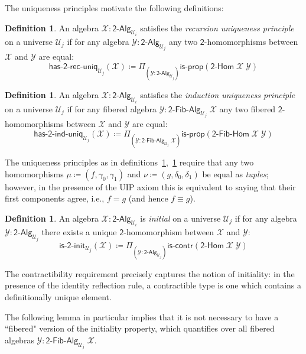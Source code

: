 \documentclass[11pt]{article}
\newcommand{\X}{\mathcal{X}}
\newcommand{\Y}{\mathcal{Y}}
\newcommand{\prd}[1]{\Pi_{#1}}
\newcommand{\defeq}{\coloneqq}
\newcommand{\Bool}{\mathsf{2}}
\newcommand{\UU}{\mathcal{U}}
\newcommand{\BoolAlg}{\mathsf{2}\text{-}\mathsf{Alg}}
\newcommand{\BoolHom}{\mathsf{2}\text{-}\mathsf{Hom}}
\newcommand{\HasBoolRecUniq}{\mathsf{has}\text{-}\mathsf{2}\text{-}\mathsf{rec}\text{-}\mathsf{uniq}}
\newcommand{\HasBoolIndUniq}{\mathsf{has}\text{-}\mathsf{2}\text{-}\mathsf{ind}\text{-}\mathsf{uniq}}
\newcommand{\BoolFibAlg}{\mathsf{2}\text{-}\mathsf{Fib}\text{-}\mathsf{Alg}}
\newcommand{\BoolFibHom}{\mathsf{2}\text{-}\mathsf{Fib}\text{-}\mathsf{Hom}}
\newcommand{\IsBoolInit}{\mathsf{is}\text{-}\mathsf{2}\text{-}\mathsf{init}}
\newcommand{\iscontr}{\mathsf{is}\text{-}\mathsf{contr}}
\newcommand{\isprop}{\mathsf{is}\text{-}\mathsf{prop}}
\theoremstyle{definition}
\newtheorem{definition}[theorem]{Definition}
\begin{document}
The uniqueness principles motivate the following definitions:

\begin{definition}\label{def:BoolRecUniq}
An algebra $\X : \BoolAlg_{\UU_i}$ satisfies the \emph{recursion uniqueness principle} on a universe $\UU_j$ if for any algebra $\Y : \BoolAlg_{\UU_j}$ any two $\Bool$-homomorphisms between $\X$ and $\Y$ are equal:
\[ \HasBoolRecUniq_{\UU_j}(\X) \defeq \prd{(\Y:\BoolAlg_{\UU_j})} \isprop(\BoolHom \; \X \; \Y)\]
\end{definition}

\begin{definition}\label{def:BoolIndUniq}
An algebra $\X : \BoolAlg_{\UU_i}$ satisfies the \emph{induction uniqueness principle} on a universe $\UU_j$ if for any fibered algebra $\Y : \BoolFibAlg_{\UU_j}\;\X$ any two fibered $\Bool$-homomorphisms between $\X$ and $\Y$ are equal:
\[ \HasBoolIndUniq_{\UU_j}(\X) \defeq \prd{(\Y:\BoolFibAlg_{\UU_j} \; \X)} \isprop(\BoolFibHom \; \X \; \Y)\]
\end{definition}

The uniqueness principles as in definitions~\ref{def:BoolRecUniq},~\ref{def:BoolIndUniq} require that
any two homomorphisms $\mu \defeq (f,\gamma_0,\gamma_1)$ and $\nu \defeq (g,\delta_0,\delta_1)$ be equal as \emph{tuples}; however, in the presence of the UIP axiom this is equivalent to saying that their first components agree, i.e., $f = g$ (and hence $f \equiv g$).

\begin{definition}\label{def:BoolInit}
An algebra $\X : \BoolAlg_{\UU_i}$ is \emph{initial} on a universe $\UU_j$ if for any algebra $\Y : \BoolAlg_{\UU_j}$ there exists a unique $\Bool$-homomorphism between $\X$ and $\Y$:
\[ \IsBoolInit_{\UU_j}(\X) \defeq \prd{(\Y:\BoolAlg_{\UU_j})} \iscontr(\BoolHom \; \X \; \Y) \]  
\end{definition}

The contractibility requirement precisely captures the notion of initiality: in the presence of the identity reflection rule, a contractible type is one which contains a definitionally unique element.

The following lemma in particular implies that it is not necessary to have a ``fibered" version of the initiality property, which quantifies over all fibered algebras $\Y : \BoolFibAlg_{\UU_j} \; \X$.
\end{document}
